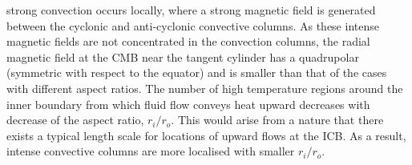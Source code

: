 strong convection occurs locally, where a strong magnetic field is generated between the cyclonic and anti-cyclonic convective columns.
%
{\color{green} %
As these intense magnetic fields are not concentrated in the  convection columns, the radial magnetic field at the CMB near the tangent cylinder has a quadrupolar (symmetric with respect to the equator) and is smaller than that of the cases with different aspect ratios.
}
%
{\color{blue}
}
%
{\color{red}
The number of high temperature regions around the inner boundary from which fluid flow conveys heat upward decreases with decrease of the aspect ratio, $r_i / r_o$.
This would arise from a nature that there exists a typical length scale for locations of upward flows at the ICB.
As a result, intense convective columns are more localised with smaller $r_i / r_o$.
}
%
%
%
